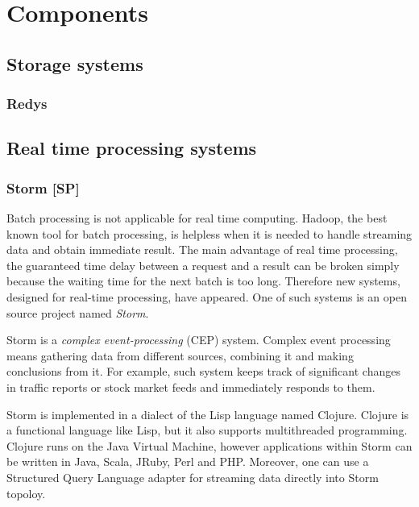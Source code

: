 \chapter{Components}
\label{chap:components}


\section{Storage systems}



\subsection{Redys}

\section{Real time processing systems}

\subsection{Storm [SP]}
Batch processing is not applicable for real time computing.
Hadoop, the best known tool for batch processing, is helpless when it is needed to handle streaming data and obtain immediate result.
The main advantage of real time processing, the guaranteed time delay between a request and a result can be broken simply because the waiting time for the next batch is too long.
Therefore new systems, designed for real-time processing, have appeared.
One of such systems is an open source project named \textit{Storm}.

Storm is a \textit{complex event-processing} (CEP) system.
Complex event processing means gathering data from different sources, combining it and making conclusions from it.
For example, such system keeps track of significant changes in traffic reports or stock market feeds and immediately responds to them. 

Storm is implemented in a dialect of the Lisp language named Clojure.
Clojure is a functional language like Lisp, but it also supports multithreaded programming.
Clojure runs on the Java Virtual Machine, however applications within Storm can be written in Java, Scala, JRuby, Perl and PHP.
Moreover, one can use a Structured Query Language adapter for streaming data directly into Storm topoloy.

